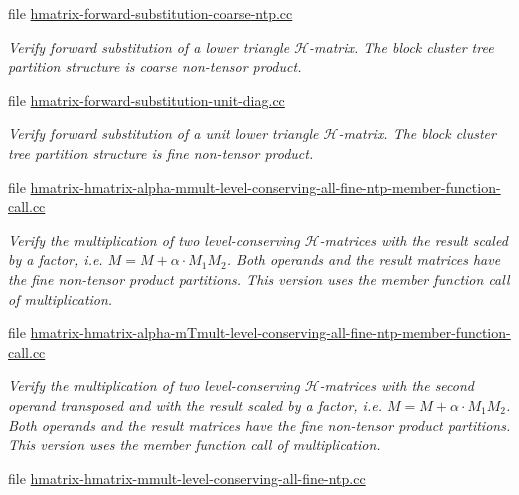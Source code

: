 \begin{DoxyCompactItemize}
file \hyperlink{hmatrix-forward-substitution-coarse-ntp_8cc}{hmatrix-\/forward-\/substitution-\/coarse-\/ntp.\+cc}
\begin{DoxyCompactList}\small\item\em Verify forward substitution of a lower triangle $\mathcal{H}$-\/matrix. The block cluster tree partition structure is coarse non-\/tensor product. \end{DoxyCompactList}\item 
file \hyperlink{hmatrix-forward-substitution-unit-diag_8cc}{hmatrix-\/forward-\/substitution-\/unit-\/diag.\+cc}
\begin{DoxyCompactList}\small\item\em Verify forward substitution of a unit lower triangle $\mathcal{H}$-\/matrix. The block cluster tree partition structure is fine non-\/tensor product. \end{DoxyCompactList}\item 
file \hyperlink{hmatrix-hmatrix-alpha-mmult-level-conserving-all-fine-ntp-member-function-call_8cc}{hmatrix-\/hmatrix-\/alpha-\/mmult-\/level-\/conserving-\/all-\/fine-\/ntp-\/member-\/function-\/call.\+cc}
\begin{DoxyCompactList}\small\item\em Verify the multiplication of two level-\/conserving $\mathcal{H}$-\/matrices with the result scaled by a factor, i.\+e. $M = M + \alpha \cdot M_1 M_2$. Both operands and the result matrices have the fine non-\/tensor product partitions. This version uses the member function call of multiplication. \end{DoxyCompactList}\item 
file \hyperlink{hmatrix-hmatrix-alpha-mTmult-level-conserving-all-fine-ntp-member-function-call_8cc}{hmatrix-\/hmatrix-\/alpha-\/m\+Tmult-\/level-\/conserving-\/all-\/fine-\/ntp-\/member-\/function-\/call.\+cc}
\begin{DoxyCompactList}\small\item\em Verify the multiplication of two level-\/conserving $\mathcal{H}$-\/matrices with the second operand transposed and with the result scaled by a factor, i.\+e. $M = M + \alpha \cdot M_1 M_2$. Both operands and the result matrices have the fine non-\/tensor product partitions. This version uses the member function call of multiplication. \end{DoxyCompactList}\item 
file \hyperlink{hmatrix-hmatrix-mmult-level-conserving-all-fine-ntp_8cc}{hmatrix-\/hmatrix-\/mmult-\/level-\/conserving-\/all-\/fine-\/ntp.\+cc}

\end{DoxyCompactItemize}

